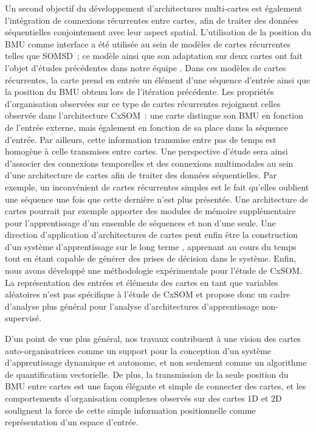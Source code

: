 Un second objectif du développement d'architectures multi-cartes est également l'intégration de connexions récurrentes entre cartes, afin de traiter des données séquentielles conjointement avec leur aspect spatial. 
L'utilisation de la position du BMU comme interface a été utilisée au sein de modèles de cartes récurrentes telles que SOMSD~; ce modèle ainsi que son adaptation sur deux cartes ont fait l'objet d'études précédentes dans notre équipe \parencite{baheux_towards_2014, fix20}. 
Dans ces modèles de cartes récurrentes, la carte prend en entrée un élément d'une séquence d'entrée ainsi que la position du BMU obtenu lors de l'itération précédente. 
Les propriétés d'organisation observées sur ce type de cartes récurrentes rejoignent celles observée dans l'architecture CxSOM~: une carte distingue son BMU en fonction de l'entrée externe, mais également en fonction de sa place dans la séquence d'entrée. Par ailleurs, cette information transmise entre pas de temps est homogène à celle transmises entre cartes.
Une perspective d'étude sera ainsi d'associer des connexions temporelles et des connexions multimodales au sein d'une architecture de cartes afin de traiter des données séquentielles.
Par exemple, un inconvénient de cartes récurrentes simples est le fait qu'elles oublient une séquence une fois que cette dernière n'est plus présentée. Une architecture de cartes pourrait par exemple apporter des modules de mémoire supplémentaire pour l'apprentissage d'un ensemble de séquences et non d'une seule.
Une direction d'application d'architectures de cartes peut enfin être la construction d'un système d'apprentissage \og sur le long terme \fg{}, apprenant au cours du temps tout en étant capable de générer des prises de décision dans le système.
Enfin, nous avons développé une méthodologie expérimentale pour l'étude de CxSOM. 
La représentation des entrées et éléments des cartes en tant que variables aléatoires n'est pas spécifique à l'étude de CxSOM et propose donc un cadre d'analyse plus général pour l'analyse d'architectures d'apprentissage non-supervisé.


D'un point de vue plus général, nos travaux contribuent à une vision des cartes auto-organisatrices comme un support pour la conception d'un système d'apprentissage dynamique et autonome, et non seulement comme un algorithme de quantification vectorielle. 
De plus, la transmission de la seule position du BMU entre cartes est une façon élégante et simple de connecter des cartes, et les comportements d'organisation complexes observés sur des cartes 1D et 2D soulignent la force de cette simple information positionnelle comme représentation d'un espace d'entrée.


